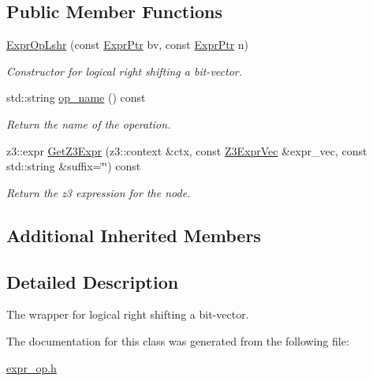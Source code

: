 \subsection*{Public Member Functions}
\begin{DoxyCompactItemize}
\item 
\mbox{\label{classilang_1_1_expr_op_lshr_a154a59a604aac2806ceaba6705a6df7a}} 
\mbox{\hyperlink{classilang_1_1_expr_op_lshr_a154a59a604aac2806ceaba6705a6df7a}{Expr\+Op\+Lshr}} (const \mbox{\hyperlink{classilang_1_1_expr_a85952b6a34620c4c8cab6bac9c9fdf8c}{Expr\+Ptr}} bv, const \mbox{\hyperlink{classilang_1_1_expr_a85952b6a34620c4c8cab6bac9c9fdf8c}{Expr\+Ptr}} n)
\begin{DoxyCompactList}\small\item\em Constructor for logical right shifting a bit-\/vector. \end{DoxyCompactList}\item 
\mbox{\label{classilang_1_1_expr_op_lshr_a74c62eb6d96f04b25ca3cef219fd6df9}} 
std\+::string \mbox{\hyperlink{classilang_1_1_expr_op_lshr_a74c62eb6d96f04b25ca3cef219fd6df9}{op\+\_\+name}} () const
\begin{DoxyCompactList}\small\item\em Return the name of the operation. \end{DoxyCompactList}\item 
\mbox{\label{classilang_1_1_expr_op_lshr_abb09309905a8b5b37d734a5b980ad0ba}} 
z3\+::expr \mbox{\hyperlink{classilang_1_1_expr_op_lshr_abb09309905a8b5b37d734a5b980ad0ba}{Get\+Z3\+Expr}} (z3\+::context \&ctx, const \mbox{\hyperlink{namespaceilang_adc4eee919aa24fff882d03a48d733c19}{Z3\+Expr\+Vec}} \&expr\+\_\+vec, const std\+::string \&suffix=\char`\"{}\char`\"{}) const
\begin{DoxyCompactList}\small\item\em Return the z3 expression for the node. \end{DoxyCompactList}\end{DoxyCompactItemize}
\subsection*{Additional Inherited Members}


\subsection{Detailed Description}
The wrapper for logical right shifting a bit-\/vector. 

The documentation for this class was generated from the following file\+:\begin{DoxyCompactItemize}
\item 
\mbox{\hyperlink{expr__op_8h}{expr\+\_\+op.\+h}}\end{DoxyCompactItemize}
